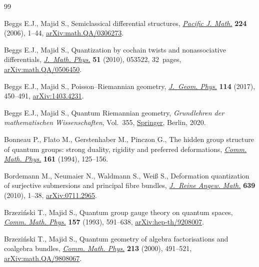 \documentclass[pdftex]{sigma}
\numberwithin{equation}{section}
\newcommand{\<}{{\langle}}
\renewcommand{\>}{{\rangle}}
\begin{document}
\begin{thebibliography}{99}
\footnotesize\itemsep=-1pt

Beggs E.J., Majid S., Semiclassical differential structures, \href{https://doi.org/10.2140/pjm.2006.224.1}{\textit{Pacific J.
 Math.}} \textbf{224} (2006), 1--44, \href{https://arxiv.org/abs/math.QA/0306273}{arXiv:math.QA/0306273}.

Beggs E.J., Majid S., Quantization by cochain twists and nonassociative
 differentials, \href{https://doi.org/10.1063/1.3371677}{\textit{J.~Math. Phys.}} \textbf{51} (2010), 053522, 32~pages,
 \href{https://arxiv.org/abs/math.QA/0506450}{arXiv:math.QA/0506450}.

Beggs E.J., Majid S., Poisson--{R}iemannian geometry, \href{https://doi.org/10.1016/j.geomphys.2016.12.012}{\textit{J.~Geom. Phys.}}
 \textbf{114} (2017), 450--491, \href{https://arxiv.org/abs/1403.4231}{arXiv:1403.4231}.

Beggs E.J., Majid S., Quantum {R}iemannian geometry, \textit{Grundlehren der
 mathematischen Wissenschaften}, Vol.~355, \href{https://doi.org/10.1007/978-3-030-30294-8}{Springer}, Berlin, 2020.

Bonneau P., Flato M., Gerstenhaber M., Pinczon G., The hidden group structure
 of quantum groups: strong duality, rigidity and preferred deformations,
 \href{https://doi.org/10.1007/BF02099415}{\textit{Comm. Math. Phys.}} \textbf{161} (1994), 125--156.

Bordemann M., Neumaier N., Waldmann S., Wei{\ss} S., Deformation quantization
 of surjective submersions and principal fibre bundles, \href{https://doi.org/10.1515/CRELLE.2010.009}{\textit{J.~Reine
 Angew. Math.}} \textbf{639} (2010), 1--38, \href{https://arxiv.org/abs/0711.2965}{arXiv:0711.2965}.

Brzezi\'nski T., Majid S., Quantum group gauge theory on quantum spaces,
 \href{https://doi.org/10.1007/BF02096884}{\textit{Comm. Math. Phys.}} \textbf{157} (1993), 591--638,
 \href{https://arxiv.org/abs/hep-th/9208007}{arXiv:hep-th/9208007}.

Brzezi\'nski T., Majid S., Quantum geometry of algebra factorisations and
 coalgebra bundles, \href{https://doi.org/10.1007/PL00005530}{\textit{Comm. Math. Phys.}} \textbf{213} (2000), 491--521,
 \href{https://arxiv.org/abs/math.QA/9808067}{arXiv:math.QA/9808067}.


\end{thebibliography}
\end{document}
